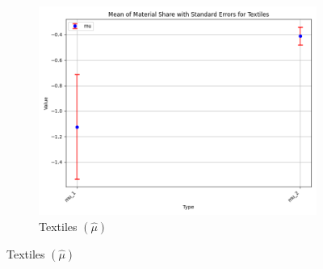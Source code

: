 \documentclass{article}
\begin{document}
\begin{figure}[ht!]
\begin{subfigure}[t]{0.32\textwidth}
        \includegraphics[width=\textwidth]{figure/empirical_ar1_normal_mu_with_error_bars_Textiles.png}
        \caption{Textiles $(\hat\mu)$}
    \end{subfigure}
\end{figure}
\end{document}
